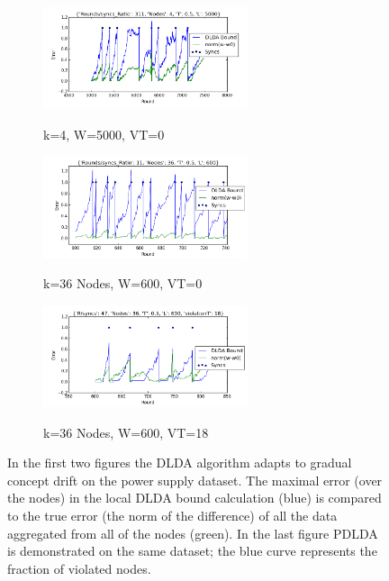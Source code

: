 \documentclass{sig-alternate-05-2015}
\begin{document}
\begin{figure}[h!]

  
  \begin{subfigure}
  \centering
  \includegraphics[width=6cm]{PowerSupply/4nodes.png} 
  \label{PowerSupplyFigure1}
  \caption{k=4, W=5000, VT=0}
  \end{subfigure}
  
  \begin{subfigure}
  \centering
  \includegraphics[width=6cm]{PowerSupply/36nodes.png}
  \label{PowerSupplyFigure2}
  \caption{k=36 Nodes, W=600, VT=0}
  \end{subfigure}
  
  \begin{subfigure}  
  \centering
  \includegraphics[width=6cm]{PowerSupply/36nodesProb.png}
  \label{PowerSupplyFigure3}
  \caption{k=36 Nodes, W=600, VT=18}
  \end{subfigure}
  \caption{In the first two figures the DLDA algorithm adapts
  to gradual concept drift on the power supply dataset.  
  The maximal error (over the nodes) in the 
  local DLDA bound calculation (blue) is compared to the true
error (the norm of the difference) of all the data aggregated from
all of the nodes (green). In the last figure PDLDA
is demonstrated on the same dataset; the blue curve represents the
fraction of violated nodes.}
\label{PowerSupplyFigures}
\end{figure}
\end{document}
